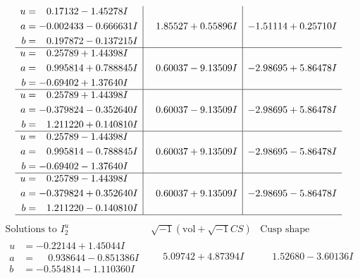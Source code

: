 \documentclass[1p]{elsarticle_modified}
\theoremstyle{definition}
\newcommand{\I}{\sqrt{-1}}
\begin{document}
$$\begin{array}{c|c|c}
\begin{aligned}
u &= \phantom{-}0.17132 - 1.45278 I \\
a &= -0.002433 - 0.666631 I \\
b &= \phantom{-}0.197872 - 0.137215 I\end{aligned}
 & \phantom{-}1.85527 + 0.55896 I & -1.51114 + 0.25710 I \\ \hline\begin{aligned}
u &= \phantom{-}0.25789 + 1.44398 I \\
a &= \phantom{-}0.995814 + 0.788845 I \\
b &= -0.69402 + 1.37640 I\end{aligned}
 & \phantom{-}0.60037 - 9.13509 I & -2.98695 + 5.86478 I \\ \hline\begin{aligned}
u &= \phantom{-}0.25789 + 1.44398 I \\
a &= -0.379824 - 0.352640 I \\
b &= \phantom{-}1.211220 + 0.140810 I\end{aligned}
 & \phantom{-}0.60037 - 9.13509 I & -2.98695 + 5.86478 I \\ \hline\begin{aligned}
u &= \phantom{-}0.25789 - 1.44398 I \\
a &= \phantom{-}0.995814 - 0.788845 I \\
b &= -0.69402 - 1.37640 I\end{aligned}
 & \phantom{-}0.60037 + 9.13509 I & -2.98695 - 5.86478 I \\ \hline\begin{aligned}
u &= \phantom{-}0.25789 - 1.44398 I \\
a &= -0.379824 + 0.352640 I \\
b &= \phantom{-}1.211220 - 0.140810 I\end{aligned}
 & \phantom{-}0.60037 + 9.13509 I & -2.98695 - 5.86478 I\\
 \hline 
 \end{array}$$\newpage$$\begin{array}{c|c|c}  
\text{Solutions to }I^u_{2}& \I (\text{vol} + \sqrt{-1}CS) & \text{Cusp shape}\\
 \hline 
\begin{aligned}
u &= -0.22144 + 1.45044 I \\
a &= \phantom{-}0.938644 - 0.851386 I \\
b &= -0.554814 - 1.110360 I\end{aligned}
 & \phantom{-}5.09742 + 4.87394 I & \phantom{-}1.52680 - 3.60136 I \\ \hline\begin{aligned}

\end{aligned}
\end{array}$$
\end{document}

